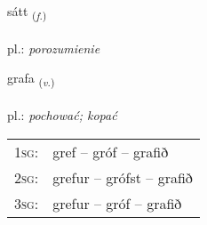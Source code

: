 \documentclass[frontgrid, backgrid]{flacards}\usepackage[]{graphicx}\usepackage[]{xcolor}
\begin{document}
\renewcommand{\flhead}{\vskip5pt \fboxsep=0pt {\small\bfseries\footnotesize Nafnorð | Noun}}
\renewcommand{\fcfoot}{\vskip5pt \fboxsep=0pt \hspace{2pt}{\small\bfseries\footnotesize 2K}}

\renewcommand{\blhead}{\vskip5pt {\small\bfseries\footnotesize Nafnorð | Noun }}
\renewcommand{\bcfoot}{\vskip5pt \hspace{2pt}{\small\bfseries\footnotesize 2K}}


{sátt \small{\textsubscript{(\textit{f.})}} \\[1ex] %
\textphonetic{[sauht]} \\
pl.: \emph{porozumienie} \\  [2ex]
\renewcommand*{\arraystretch}{0.8}
}

\renewcommand{\flhead}{\vskip5pt \fboxsep=0pt {\small\bfseries\footnotesize Sagnorð | Verb}}
\renewcommand{\fcfoot}{\vskip5pt \fboxsep=0pt \hspace{2pt}{\small\bfseries\footnotesize 2K}}

\renewcommand{\blhead}{\vskip5pt {\small\bfseries\footnotesize Sagnorð | Verb }}
\renewcommand{\bcfoot}{\vskip5pt \hspace{2pt}{\small\bfseries\footnotesize 2K}}


{grafa \small{\textsubscript{(\textit{v.})}} \\[1ex] %
\textphonetic{[kraːva]} \\
pl.: \emph{pochować; kopać} \\  [2ex]
\renewcommand*{\arraystretch}{0.8}
\begin{tabular}{p{1cm}l}
\textsc{1sg}: & gref -- gróf -- grafið \\ 
\textsc{2sg}: & grefur -- grófst -- grafið \\ 
\textsc{3sg}: & grefur -- gróf -- grafið \\ 
\end{tabular}
}
\end{document}
